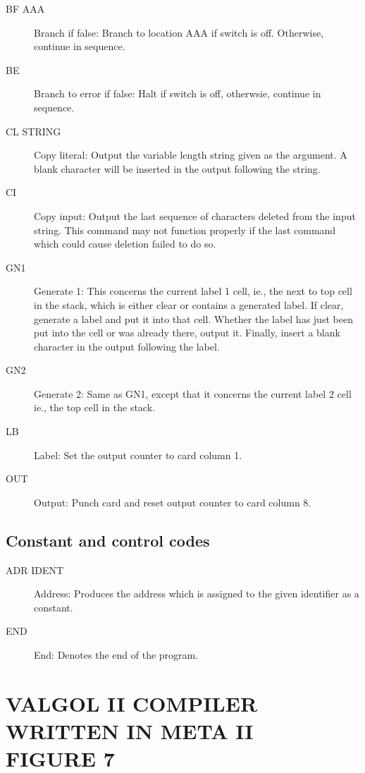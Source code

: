 \documentclass[twocolumn]{article}
\begin{document}
\begin{description}
\item[BF  AAA] Branch if false: Branch to location AAA if switch is off.
Otherwise, continue in sequence.
\item[BE] Branch to error if false: Halt if switch is off, otherwsie,
continue in sequence.
\item[CL  STRING] Copy literal: Output the variable length string given as the argument.
A blank character will be inserted in the output following the string.
\item[CI] Copy input: Output the last sequence of characters deleted from the
input string. This command may not function properly if the last command
which could cause deletion failed to do so.
\item[GN1] Generate 1: This concerns the current label 1 cell, ie., the next
to top cell in the stack, which is either clear or contains a generated label.
If clear, generate a label and put it into that cell.
Whether the label has just been put into the cell or was already there, output
it.
Finally, insert a blank character in the output following the label.
\item[GN2] Generate 2: Same as GN1, except that it concerns the current label
2 cell ie., the top cell in the stack.
\item[LB] Label: Set the output counter to card column 1.
\item[OUT] Output: Punch card and reset output counter to card column 8.
\end{description}

\subsection{Constant and control codes}
\begin{description}
\item[ADR IDENT] Address: Produces the address which is assigned to the given
identifier as a constant.
\item[END] End: Denotes the end of the program.
\end{description}

\pagebreak

\section{VALGOL II COMPILER WRITTEN IN META II\\FIGURE 7}



\pagebreak
\end{document}
